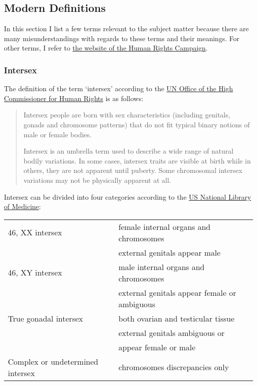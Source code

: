 \subsection{Modern Definitions}
In this section I list a few terms relevant to the subject matter because there are many misunderstandings with regards to these terms and their meanings. For other terms, I refer to \href{https://www.hrc.org/resources/glossary-of-terms}{the website of the Human Rights Campaign}.

\subsubsection*{Intersex}
\label{intersex}

The definition of the term `intersex' according to the \href{https://unfe.org/system/unfe-65-Intersex_Factsheet_ENGLISH.pdf}{UN Office of the High Commissioner for Human Rights} is as follows:

\begin{quote}
Intersex people are born with sex characteristics (including genitals, gonads and chromosome patterns) that do not fit typical binary notions of male or female bodies.

Intersex is an umbrella term used to describe a wide range of natural bodily variations. In some cases, intersex traits are visible at birth while in others, they are not apparent until puberty. Some chromosomal intersex variations may not be physically apparent at all.
\end{quote}

Intersex can be divided into four categories according to the \href{https://medlineplus.gov/ency/article/001669.htm}{US National Library of Medicine}:

\begin{tabular}{ l l }
46, XX intersex & female internal organs and chromosomes\\
& external genitals appear male\\
46, XY intersex & male internal organs and chromosomes\\
& external genitals appear female or ambiguous\\
True gonadal intersex & both ovarian and testicular tissue\\
& external genitals ambiguous or\\
& appear female or male\\
Complex or undetermined intersex & chromosomes discrepancies only\\
\end{tabular}

